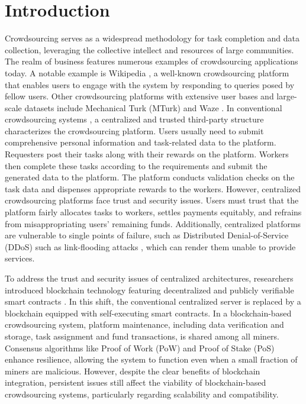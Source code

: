 \documentclass[10pt,journal]{IEEEtran}
\begin{document}
\section{Introduction}
Crowdsourcing serves as a widespread methodology for task completion and data collection, leveraging the collective intellect and resources of large communities. The realm of business features numerous examples of crowdsourcing applications today. A notable example is Wikipedia \cite{wikipedia}, a well-known crowdsourcing platform that enables users to engage with the system by responding to queries posed by fellow users. Other crowdsourcing platforms with extensive user bases and large-scale datasets include Mechanical Turk (MTurk) \cite{MechanicalTurk} and Waze \cite{Waze}. In conventional crowdsourcing systems \cite{wu2014smartphones, to2016differentially, wang2019optimization, xiao2016online, miao2017lightweight}, a centralized and trusted third-party structure characterizes the crowdsourcing platform. Users usually need to submit comprehensive personal information and task-related data to the platform. Requesters post their tasks along with their rewards on the platform. Workers then complete these tasks according to the requirements and submit the generated data to the platform. The platform conducts validation checks on the task data and dispenses appropriate rewards to the workers. However, centralized crowdsourcing platforms face trust and security issues. Users must trust that the platform fairly allocates tasks to workers, settles payments equitably, and refrains from misappropriating users' remaining funds. Additionally, centralized platforms are vulnerable to single points of failure, such as Distributed Denial-of-Service (DDoS) such as link-flooding attacks \cite{huang2024you}, which can render them unable to provide services.

To address the trust and security issues of centralized architectures, researchers introduced blockchain technology featuring decentralized and publicly verifiable smart contracts \cite{an2022ppqc, li2018crowdbc, lu2018zebralancer}. In this shift, the conventional centralized server is replaced by a blockchain equipped with self-executing smart contracts. In a blockchain-based crowdsourcing system, platform maintenance, including data verification and storage, task assignment and fund transactions, is shared among all miners. Consensus algorithms like Proof of Work (PoW) \cite{nakamoto2008bitcoin} and Proof of Stake (PoS) \cite{king2012ppcoin} enhance resilience, allowing the system to function even when a small fraction of miners are malicious. However, despite the clear benefits of blockchain integration, persistent issues still affect the viability of blockchain-based crowdsourcing systems, particularly regarding scalability and compatibility.
\end{document}
